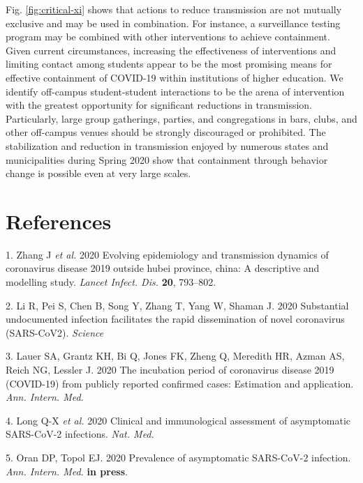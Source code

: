 \documentclass[
]{article}
\begin{document}
Fig. \ref{fig:critical-xi} shows that actions to reduce transmission are
not mutually exclusive and may be used in combination. For instance, a
surveillance testing program may be combined with other interventions to
achieve containment. Given current circumstances, increasing the
effectiveness of interventions and limiting contact among students
appear to be the most promising means for effective containment of
COVID-19 within institutions of higher education. We identify off-campus
student-student interactions to be the arena of intervention with the
greatest opportunity for significant reductions in transmission.
Particularly, large group gatherings, parties, and congregations in
bars, clubs, and other off-campus venues should be strongly discouraged
or prohibited. The stabilization and reduction in transmission enjoyed
by numerous states and municipalities during Spring 2020 show that
containment through behavior change is possible even at very large
scales.

\hypertarget{references}{%
\section*{References}\label{references}}

\hypertarget{refs}{}
\leavevmode\hypertarget{ref-Zhang2020-ih}{}%
1. Zhang J \emph{et al.} 2020 Evolving epidemiology and transmission
dynamics of coronavirus disease 2019 outside hubei province, china: A
descriptive and modelling study. \emph{Lancet Infect. Dis.} \textbf{20},
793--802.

\leavevmode\hypertarget{ref-Li2020-hc}{}%
2. Li R, Pei S, Chen B, Song Y, Zhang T, Yang W, Shaman J. 2020
Substantial undocumented infection facilitates the rapid dissemination
of novel coronavirus (SARS-CoV2). \emph{Science}

\leavevmode\hypertarget{ref-Lauer2020-mr}{}%
3. Lauer SA, Grantz KH, Bi Q, Jones FK, Zheng Q, Meredith HR, Azman AS,
Reich NG, Lessler J. 2020 The incubation period of coronavirus disease
2019 (COVID-19) from publicly reported confirmed cases: Estimation and
application. \emph{Ann. Intern. Med.}

\leavevmode\hypertarget{ref-Long2020-ny}{}%
4. Long Q-X \emph{et al.} 2020 Clinical and immunological assessment of
asymptomatic SARS-CoV-2 infections. \emph{Nat. Med.}

\leavevmode\hypertarget{ref-Oran2020-aq}{}%
5. Oran DP, Topol EJ. 2020 Prevalence of asymptomatic SARS-CoV-2
infection. \emph{Ann. Intern. Med.} \textbf{in press}.
\end{document}
